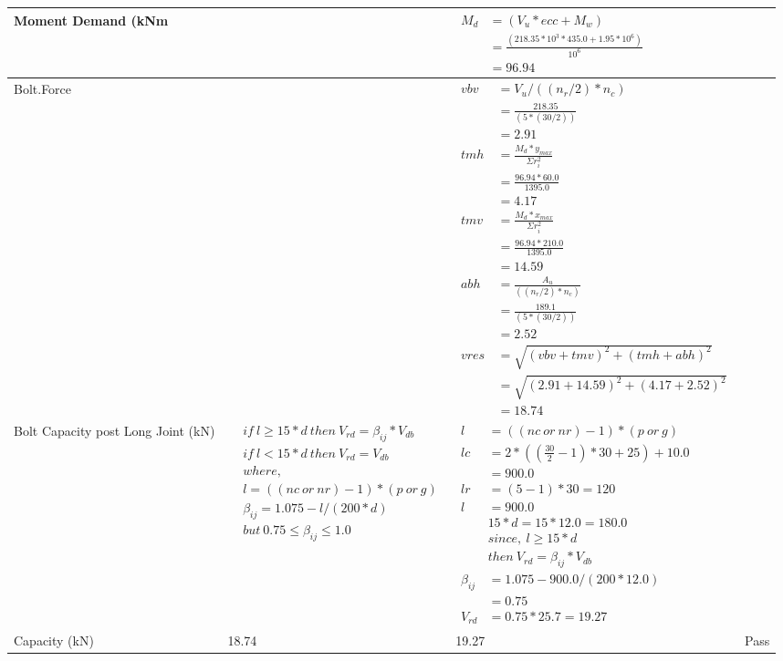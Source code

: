 \documentclass{article}%
\begin{document}
\begin{longtable}{|p{3cm}|p{5cm}|p{7.5cm}|p{1.5cm}|}
\hline%
Moment Demand (kNm&&$\begin{aligned}  M_d &= (V_u * ecc + M_w)\\  &= \frac{(218.35 * 10^3 *435.0 + 1.95*10^6)}{10^6}\\  & =96.94\end{aligned}$&\\%
\hline%
Bolt.Force&&$\begin{aligned} vbv~~ &= V_u / ((n_r/2) * n_c)\\  &= \frac{218.35}{ (5*(30/2))}\\  & =2.91\\ tmh~ &= \frac{M_d * y_{max} }{ \Sigma r_i^2} \\  &= \frac{96.94 *60.0}{1395.0}\\  & =4.17\\  tmv ~&= \frac{M_d * x_{max}}{\Sigma r_i^2}\\ &= \frac{96.94 * 210.0}{1395.0}\\  & =14.59\\  abh~ & = \frac{A_u }{((n_r/2) * n_c)}\\   & =\frac{189.1}{ (5 *(30/2))}\\  & =2.52\\  vres &=\sqrt{(vbv +tmv) ^ 2 + (tmh+abh) ^ 2}\\   &= \sqrt{(2.91 +14.59) ^2 + (4.17+2.52) ^ 2}\\  & =18.74\end{aligned}$&\\%
\hline%
Bolt Capacity post Long Joint (kN)&$\begin{aligned} &if~l\geq 15 * d~then~V_{rd} = \beta_{ij} * V_{db} \\ & if~l < 15 * d~then~V_{rd} = V_{db} \\ & where,\\ & l = ((nc~or~nr) - 1) * (p~or~g) \\ & \beta_{ij} = 1.075 - l/(200 * d) \\ & but~0.75\leq\beta_{ij}\leq1.0 \end{aligned}$&$\begin{aligned} l&= ((nc~or~nr) - 1) * (p~or~g) \\  lc&= 2*((\frac{30}{2} - 1) * 30+25)+ 10.0\\&=900.0\\  lr&= (5 - 1) * 30=120\\  l&= 900.0\\ & 15 * d = 15 * 12.0 = 180.0 \\ &since,~l \geq 15 * d~ \\&then~V_{rd} = \beta_{ij} * V_{db} \\ \beta_{ij} &= 1.075 - 900.0/(200*12.0) \\&=0.75\\ V_{rd} &= 0.75 * 25.7=19.27 \end{aligned}$&\\%
\hline%
Capacity (kN)&18.74&19.27&Pass\\%
\hline%
\end{longtable}
\end{document}
